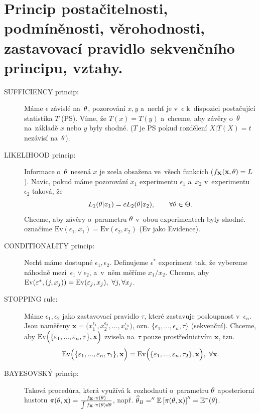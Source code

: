 \chapter{Princip postačitelnosti, podmíněnosti, věrohodnosti, zastavovací pravidlo sekvenčního principu, vztahy.}
\begin{description}
	\item[SUFFICIENCY princip:] Máme $\epsilon$ závislé na~$\theta$, pozorování $x,y$ a~nechť je v~$\epsilon$ k~dispozici postačující statistika $T$ (PS). Víme, že $T(x)=T(y)$ a~chceme, aby závěry o~$\theta$ na~základě $x$ nebo $y$ byly shodné. ($T$ je PS pokud rozdělení $X|T(X)=t$ nezávisí na~$\theta$).

\item[LIKELIHOOD princip:] Informace o~$\theta$ nesená $x$ je zcela obsažena ve~všech funkcích ($f_{\textbf{X}}(\textbf{x},\theta)=L$). Navíc, pokud máme pozorování $x_1$ experimentu $\epsilon_1$ a~$x_2$ v~experimentu $\epsilon_2$ taková, že 
$$ L_1(\theta|x_1)=c L_2(\theta|x_2),\qquad\forall\theta\in\Theta.$$
Chceme, aby závěry o~parametru $\theta$ v~obou experimentech byly shodné. označíme $\mathrm{Ev}(\epsilon_1,x_1)=\mathrm{Ev}(\epsilon_2,x_2)$ (Ev jako Evidence). 
\item[CONDITIONALITY princip:] Nechť máme dostupné $\epsilon_1,\epsilon_2$. Definujeme $\epsilon^*$ experiment tak, že vybereme náhodně mezi~$\epsilon_1 \vee \epsilon_2$, a~v~něm měříme $x_1/x_2$. Chceme, aby $\mathrm{Ev}(\varepsilon^*,(j,x_j))=\mathrm{Ev}(\varepsilon_j,x_j),~\forall j,\forall x_j$.
\item[STOPPING rule:] Máme $\epsilon_1,\epsilon_2$ jako zastavovací pravidlo $\tau$, které zastavuje posloupnost v~$\epsilon_n$. Jsou naměřeny $\textbf{x}=\Big( x_1^{\epsilon_1},x_2^{\epsilon_2},...,x_n^{\epsilon_n} \Big)$, ozn. $\{ \epsilon_1,...,\epsilon_n,\tau \}$ (sekvenční). Chceme, aby $\mathrm{Ev}\Big( \{ \varepsilon_1,...,\varepsilon_n,\tau \},\textbf{x} \Big)$ zvisela na~$\tau$ pouze prostřednictvím $\textbf{x}$, tzn. $$\mathrm{Ev}\Big( \{ \varepsilon_1,...,\varepsilon_n,\tau_1 \},\textbf{x} \Big)=\mathrm{Ev}\Big( \{ \varepsilon_1,...,\varepsilon_n,\tau_2 \},\textbf{x} \Big),~\forall \textbf{x}.$$
\item[BAYESOVSKÝ princip:] Taková procedůra, která využívá k~rozhodnutí o~parametru $\theta$ aposteriorní hustotu $\pi(\theta,\textbf{x})=\frac{f_{\textbf{X}}\cdot\pi(\theta)}{\int f_{\textbf{X}}\cdot\pi(\theta) d\theta}$, např. $\widehat{\theta}_B=''\mathbb{E}\left[ \pi(\theta,\textbf{x}) \right]''=\mathbb{E}^\pi(\theta)$.
\end{description}

